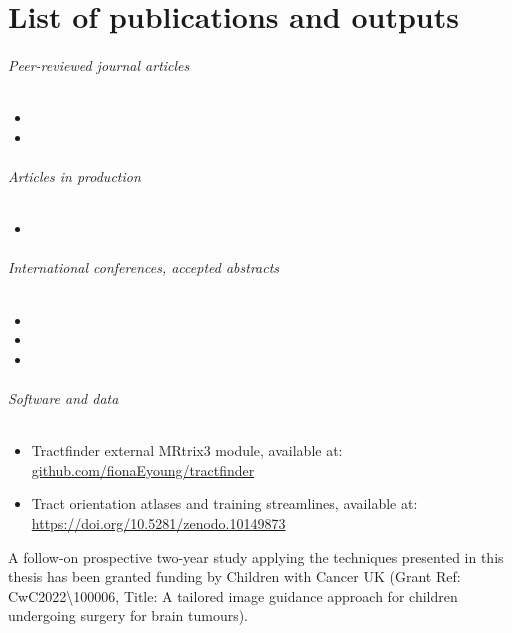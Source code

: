 \chapter*{List of publications and outputs}

\subparagraph*{Peer-reviewed journal articles}
\begin{itemize}
  \item[] 
  \item[] 
\end{itemize}
\subparagraph*{Articles in production}
\begin{itemize}
  \item[] 
\end{itemize}
\subparagraph*{International conferences, accepted abstracts}
\begin{itemize}
  \item[] 
  \item[] 
  \item[] 
\end{itemize}

\subparagraph*{Software and data}
\begin{itemize}
  \item[] Tractfinder external MRtrix3 module, available at: \url{github.com/fionaEyoung/tractfinder}
  \item[] Tract orientation atlases and training streamlines, available at: \url{https://doi.org/10.5281/zenodo.10149873}
\end{itemize}

\noindent A follow-on prospective two-year study applying the techniques presented in this thesis has been granted funding by Children with Cancer UK (Grant Ref: CwC2022\textbackslash100006, Title:  A tailored image guidance approach for children undergoing surgery for brain tumours).
